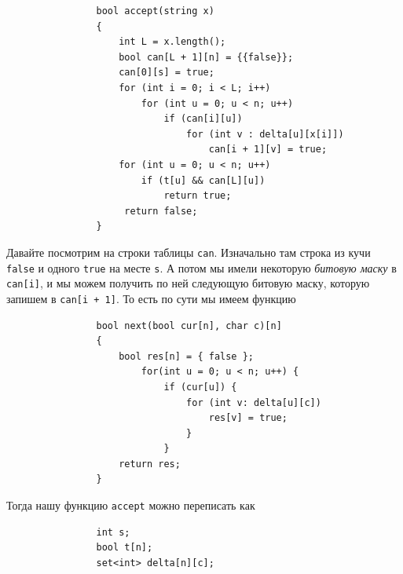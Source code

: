 \documentclass{article}
\begin{document}
\begin{itemize}
\begin{Proof}
\begin{verbatim}
                bool accept(string x)
                {
                    int L = x.length();
                    bool can[L + 1][n] = {{false}};
                    can[0][s] = true;
                    for (int i = 0; i < L; i++)
                        for (int u = 0; u < n; u++)
                            if (can[i][u])
                                for (int v : delta[u][x[i]])
                                    can[i + 1][v] = true;
                    for (int u = 0; u < n; u++)
                        if (t[u] && can[L][u])
                            return true;
                     return false;
                }
            \end{verbatim}
            Давайте посмотрим на строки таблицы \texttt{can}. Изначально там строка из кучи \texttt{false} и одного \texttt{true} на месте \texttt{s}. А потом мы имели некоторую \textit{битовую маску} в \texttt{can[i]}, и мы можем получить по ней следующую битовую маску, которую запишем в \texttt{can[i + 1]}. То есть по сути мы имеем функцию
            \begin{verbatim}
                bool next(bool cur[n], char c)[n]
                {
                    bool res[n] = { false };
                        for(int u = 0; u < n; u++) {
                            if (cur[u]) {
                                for (int v: delta[u][c])
                                    res[v] = true;
                                }
                            }
                    return res;
                }
            \end{verbatim}
            Тогда нашу функцию \texttt{accept} можно переписать как
            \begin{verbatim}
                int s;
                bool t[n];
                set<int> delta[n][c];
                

\end{verbatim}
\end{Proof}
\end{itemize}
\end{document}

